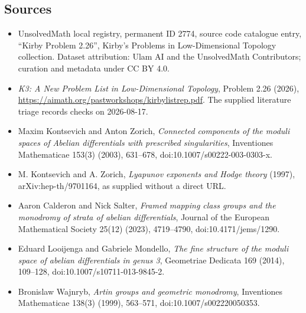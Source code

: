 \documentclass[11pt]{article}
\begin{document}
\subsection{Sources}
\begin{itemize}
\item UnsolvedMath local registry, permanent ID 2774, source code catalogue entry, ``Kirby Problem 2.26'', Kirby's Problems in Low-Dimensional Topology collection. Dataset attribution: Ulam AI and the UnsolvedMath Contributors; curation and metadata under CC BY 4.0.
\item \emph{K3: A New Problem List in Low-Dimensional Topology}, Problem 2.26 (2026), \url{https://aimath.org/pastworkshops/kirbylistrep.pdf}. The supplied literature triage records checks on 2026-08-17.
\item [KZ03] Maxim Kontsevich and Anton Zorich, \emph{Connected components of the moduli spaces of Abelian differentials with prescribed singularities}, Inventiones Mathematicae 153(3) (2003), 631--678, doi:10.1007/s00222-003-0303-x.
\item [KZ97] M. Kontsevich and A. Zorich, \emph{Lyapunov exponents and Hodge theory} (1997), arXiv:hep-th/9701164, as supplied without a direct URL.
\item [CS23] Aaron Calderon and Nick Salter, \emph{Framed mapping class groups and the monodromy of strata of abelian differentials}, Journal of the European Mathematical Society 25(12) (2023), 4719--4790, doi:10.4171/jems/1290.
\item [LM14] Eduard Looijenga and Gabriele Mondello, \emph{The fine structure of the moduli space of abelian differentials in genus 3}, Geometriae Dedicata 169 (2014), 109--128, doi:10.1007/s10711-013-9845-2.
\item [Waj99] Bronislaw Wajnryb, \emph{Artin groups and geometric monodromy}, Inventiones Mathematicae 138(3) (1999), 563--571, doi:10.1007/s002220050353.
\end{itemize}
\end{document}
